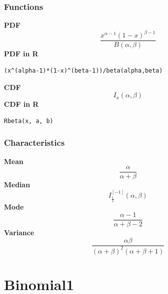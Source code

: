 \subsubsection*{Functions}

\smallskip \noindent \hspace{.2cm} \textbf{PDF} 
\begin{equation*}\frac{x^{\alpha-1}(1-x)^{\beta-1}} {B(\alpha,\beta)} \end{equation*}
\smallskip \noindent \hspace{.2cm} \textbf{PDF in R}  
\begin{verbatim}(x^(alpha-1)*(1-x)^(beta-1))/beta(alpha,beta)\end{verbatim}
\smallskip \noindent \hspace{.2cm} \textbf{CDF} 
\begin{equation*}I_x(\alpha,\beta)\end{equation*}
\smallskip \noindent \hspace{.2cm} \textbf{CDF in R} 
\begin{verbatim}Rbeta(x, a, b)\end{verbatim}
\smallskip
\subsubsection*{Characteristics}
\smallskip \noindent \hspace{.2cm} \textbf{Mean} 
\begin{equation*}\frac{\alpha}{\alpha+\beta}\end{equation*}
\smallskip \noindent \hspace{.2cm} \textbf{Median} 
\begin{equation*}I_{\frac{1}{2}}^{[-1]}(\alpha,\beta)\end{equation*}
\smallskip \noindent \hspace{.2cm} \textbf{Mode} 
\begin{equation*}\frac{\alpha-1}{\alpha+\beta-2}\end{equation*}
\smallskip \noindent \hspace{.2cm} \textbf{Variance} 
\begin{equation*}\frac{\alpha\beta}{(\alpha+\beta)^2(\alpha+\beta+1)}\end{equation*}
\smallskip
\section*{Binomial1} 

  \bigskip 

